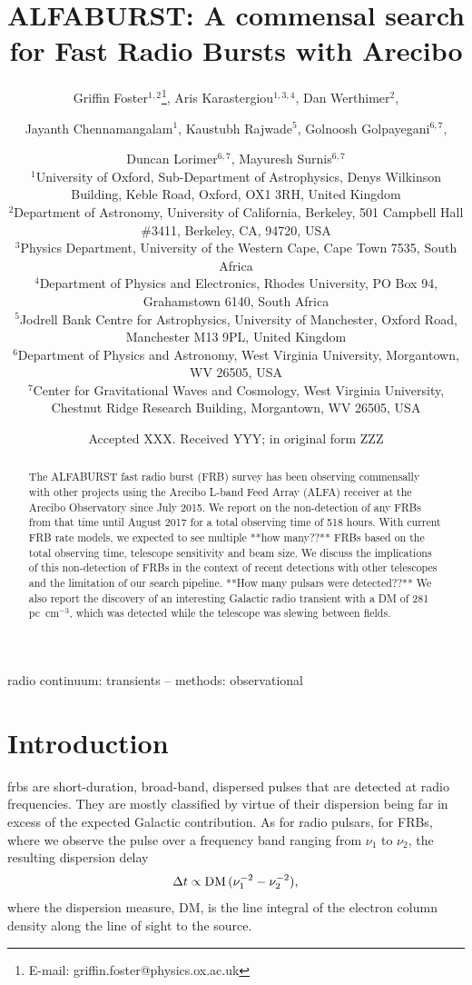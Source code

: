 \documentclass[a4paper,fleqn,usenatbib]{mnras}
\title[The ALFABURST Commensal FRB Survey]{ALFABURST: A commensal search for
Fast Radio Bursts with Arecibo}
\author[G. Foster et al.]{Griffin Foster$^{1,2}$\thanks{E-mail: griffin.foster@physics.ox.ac.uk},
Aris Karastergiou$^{1,3,4}$,
Dan Werthimer$^{2}$,
\and Jayanth Chennamangalam$^{1}$,
Kaustubh Rajwade$^{5}$,
Golnoosh Golpayegani$^{6,7}$,
\and Duncan Lorimer$^{6,7}$,
Mayuresh Surnis$^{6,7}$
\\
$^{1}$University of Oxford, Sub-Department of Astrophysics, Denys Wilkinson Building, Keble Road, Oxford, OX1 3RH, United Kingdom\\
$^{2}$Department of Astronomy, University of California, Berkeley, 501 Campbell Hall \#3411, Berkeley, CA, 94720, USA\\
$^{3}$Physics Department, University of the Western Cape, Cape Town 7535, South Africa\\
$^{4}$Department of Physics and Electronics, Rhodes University, PO Box 94, Grahamstown 6140, South Africa\\
$^{5}$Jodrell Bank Centre for Astrophysics, University of Manchester, Oxford Road, Manchester M13 9PL, United Kingdom\\ 
$^{6}$Department of Physics and Astronomy, West Virginia University, Morgantown, WV 26505, USA\\
$^{7}$Center for Gravitational Waves and Cosmology, West Virginia University, Chestnut Ridge Research Building, Morgantown, WV 26505, USA\\
}
\date{Accepted XXX. Received YYY; in original form ZZZ}
\begin{document}
\label{firstpage}
\pagerange{\pageref{firstpage}--\pageref{lastpage}}
\maketitle

\begin{abstract}
The ALFABURST fast radio burst (FRB) survey has been observing commensally with
other projects using the Arecibo L-band Feed Array (ALFA) receiver at the
Arecibo Observatory since July 2015. We report on the non-detection of any FRBs
from that time until August 2017 for a total observing time of 518 hours.
With current FRB rate models, we expected to see multiple **how many??** FRBs based on the
total observing time, telescope sensitivity and beam size. We discuss the
implications of this non-detection of FRBs in the context of recent detections
with other telescopes and the limitation of our search pipeline. **How many pulsars were
detected??** We also report
the discovery of an interesting Galactic radio transient with a DM of 281 pc~cm$^{-3}$, which was detected while the telescope was slewing between fields.
\end{abstract}

\begin{keywords}
radio continuum: transients -- methods: observational
\end{keywords}


\section{Introduction}
\label{sec:intro}

\glspl{frb} are short-duration, broad-band, dispersed pulses that are detected
at radio frequencies. They are mostly classified by virtue of their dispersion
being far in excess of the expected Galactic contribution. As for radio pulsars,
for FRBs, where we observe the pulse over a frequency band ranging from $\nu_1$ to $\nu_2$,
the resulting dispersion delay 
%
\begin{equation}
\Delta t \propto {\rm DM} \, (\nu_1^{-2} - \nu_2^{-2}),
\end{equation}
%
where the dispersion measure, DM, is the line integral of
the electron column density along the line of sight to the source.
\end{document}
